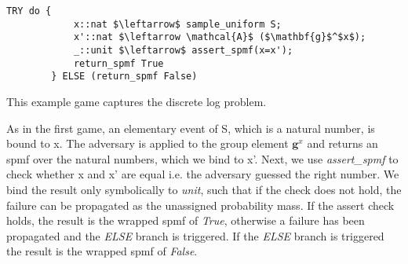 \begin{example}
    \label{assert_spmf_exmpl}
    \hspace{0mm}
    \begin{lstlisting}[language=isabelle]
        TRY do {
            x::nat $\leftarrow$ sample_uniform S;
            x'::nat $\leftarrow \mathcal{A}$ ($\mathbf{g}$^$x$);
            _::unit $\leftarrow$ assert_spmf(x=x');
            return_spmf True
        } ELSE (return_spmf False)
    \end{lstlisting}

    This example game captures the discrete log problem.

    As in the first game, an elementary event of S, which is a natural number, is bound to x. The adversary is applied to the group element $\mathbf{g}^x$ and returns an spmf over the natural numbers, which we bind to x'.
    Next, we use \textit{assert\_spmf} to check whether x and x' are equal i.e. the adversary guessed the right number. We bind the result only symbolically to \textit{unit}, such that if the check does not hold, the failure can be propagated as the unassigned probability mass. If the assert check holds, the result is the wrapped spmf of \textit{True}, otherwise a failure has been propagated and the \textit{ELSE} branch is triggered. 
    If the \textit{ELSE} branch is triggered the result is the wrapped spmf of \textit{False}.

\end{example}